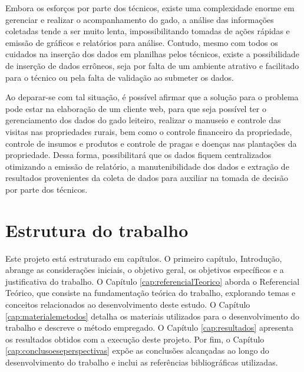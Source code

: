 Embora os esforços por parte dos técnicos, existe uma complexidade enorme em gerenciar e realizar o acompanhamento do gado, a análise das informações coletadas tende a ser muito lenta, impossibilitando tomadas de ações rápidas e emissão de gráficos e relatórios para análise. Contudo, mesmo com todos os cuidados na inserção dos dados em planilhas pelos técnicos, existe a possibilidade de inserção de dados errôneos, seja por falta de um ambiente atrativo e facilitado para o técnico ou pela falta de validação ao submeter os dados.

Ao deparar-se com tal situação, é possível afirmar que a solução para o problema pode estar na elaboração de um cliente web, para que seja possível ter o gerenciamento dos dados do gado leiteiro, realizar o manuseio e controle das visitas nas propriedades rurais, bem como o controle financeiro da propriedade, controle de insumos e produtos e controle de pragas e doenças nas plantações da propriedade. Dessa forma, possibilitará que os dados fiquem centralizados otimizando a emissão de relatório, a manutenibilidade dos dados e extração de resultados provenientes da coleta de dados para auxiliar na tomada de decisão por parte dos técnicos.


\section{Estrutura do trabalho}\label{sec:estruturaTrabalho}

Este projeto está estruturado em capítulos. O primeiro capítulo, Introdução, abrange as considerações iniciais, o objetivo geral, os objetivos específicos e a justificativa do trabalho. O Capítulo \ref{cap:referencialTeorico} aborda o Referencial Teórico, que consiste na fundamentação teórica do trabalho, explorando temas e conceitos relacionados ao desenvolvimento deste estudo. O Capítulo \ref{cap:materialemetodos} detalha os materiais utilizados para o desenvolvimento do trabalho e descreve o método empregado. O Capítulo \ref*{cap:resultados} apresenta os resultados obtidos com a execução deste projeto. Por fim, o Capítulo \ref{cap:conclusoeseperspectivas} expõe as conclusões alcançadas ao longo do desenvolvimento do trabalho e inclui as referências bibliográficas utilizadas.

